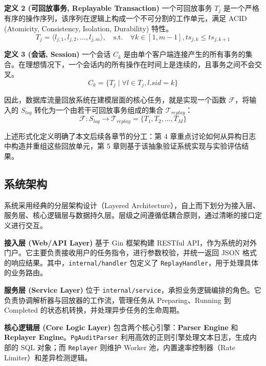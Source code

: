 \textbf{定义 2 (可回放事务, Replayable Transaction)}
一个可回放事务 $T_j$ 是一个严格有序的操作序列，该序列在逻辑上构成一个不可分割的工作单元，满足 ACID (Atomicity, Consistency, Isolation, Durability) 特性。
\begin{equation}
    T_j = \langle l_{j,1}, l_{j,2}, \dots, l_{j,m} \rangle, \quad \text{s.t.} \quad \forall k \in [1, m-1], ts_{j,k} \le ts_{j,k+1}
\end{equation}

\textbf{定义 3 (会话, Session)}
一个会话 $C_k$ 是由单个客户端连接产生的所有事务的集合。在理想情况下，一个会话内的所有操作在时间上是连续的，且事务之间不会交叉。
\begin{equation}
    C_k = \{ T_j \mid \forall l \in T_j, l.sid = k \}
\end{equation}

因此，数据库流量回放系统在建模层面的核心任务，就是实现一个函数 $\mathcal{F}$，将输入的 $S_{log}$ 转化为一个由若干可回放事务组成的集合 $\mathcal{T}_{replay}$：
\begin{equation}
    \mathcal{F}: S_{log} \rightarrow \mathcal{T}_{replay} = \{ T_1, T_2, \dots, T_M \}
\end{equation}

上述形式化定义明确了本文后续各章节的分工：第 4 章重点讨论如何从异构日志中构造并重组这些回放单元，第 5 章则基于该抽象验证系统实现与实验评估结果。

\subsection{系统架构}

系统采用经典的分层架构设计（Layered Architecture）\cite{CleanArchitecture}，自上而下划分为接入层、服务层、核心逻辑层与数据持久层。层级之间遵循低耦合原则，通过清晰的接口定义进行交互。

\textbf{接入层 (Web/API Layer)} 基于 Gin 框架\cite{GinFramework}构建 RESTful API，作为系统的对外门户。它主要负责接收用户的任务指令，进行参数校验，并统一返回 JSON 格式的响应结果。其中，\texttt{internal/handler} 包定义了 \texttt{ReplayHandler}，用于处理具体的业务路由。

\textbf{服务层 (Service Layer)} 位于 \texttt{internal/service}，承担业务逻辑编排的角色。它负责协调解析器与回放器的工作流，管理任务从 Preparing、Running 到 Completed 的状态机转换，并处理异步任务的生命周期。

\textbf{核心逻辑层 (Core Logic Layer)} 包含两个核心引擎：\textbf{Parser Engine} 和 \textbf{Replayer Engine}。\texttt{PgAuditParser} 利用高效的正则引擎处理文本日志，生成内部的 SQL 对象；而 \texttt{Replayer} 则维护 Worker 池，内置速率控制器（Rate Limiter）和差异检测逻辑。

